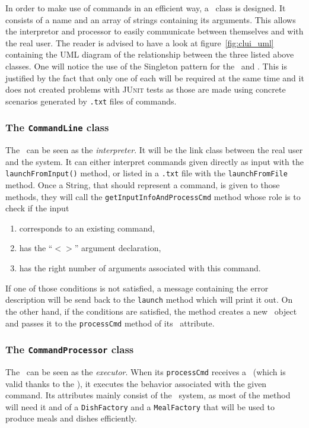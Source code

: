 In order to make use of commands in an efficient way,
a \Command~class is designed.
It consists of a name and an array
of strings containing its arguments.
This allows the interpretor and processor to easily
communicate between themselves and with the real user.
The reader is advised to have a look at figure~\ref{fig:clui_uml}
containing the UML diagram of the relationship between
the three listed above classes.
One will notice the use of the Singleton pattern for
the \CommandProcessor~and \CommandLine.
This is justified by the fact that only one
of each will be required at the same time
and it does not created problems with \textsc{JUnit} tests
as those are made using concrete scenarios
generated by \texttt{.txt} files of commands.

\subsubsection{The \texttt{CommandLine} class} %
\label{ssub:the_commandline_class}
The \CommandLine~can be seen as the \emph{interpreter}. It will be the link
class between the real user and the system. It can either interpret commands
given directly as input with the \lstinline|launchFromInput()| method,
or listed in a \texttt{.txt} file with the \lstinline|launchFromFile| method.
Once a String, that should represent a command, is given to those methods,
they will call the \lstinline|getInputInfoAndProcessCmd| method whose
role is to check if the input
\begin{enumerate}
  \item corresponds to an existing command,
  \item has the ``$<>$'' argument declaration,
  \item has the right number of arguments associated with this command. 
\end{enumerate}
If one of those conditions is not satisfied, a message containing the
error description will be send back to the \lstinline|launch| method
which will print it out.
On the other hand, if the conditions are satisfied, the method
creates a new \Command~object and passes it to the \lstinline|processCmd|
method of its \CommandProcessor~attribute.

\subsubsection{The \texttt{CommandProcessor} class} %
\label{ssub:the_commandprocessor_class}
The \CommandProcessor~can be seen as the \emph{executor}.
When its \lstinline|processCmd| receives a \Command~(which
is valid thanks to the \CommandLine),
it executes the behavior associated with the given command.
Its attributes mainly consist of the \Core~system,
as most of the method will need it and of 
a \lstinline|DishFactory| and a \lstinline|MealFactory|
that will be used to produce meals and dishes efficiently.

